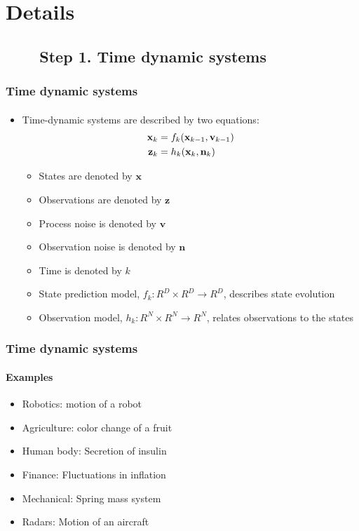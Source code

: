 \section{Details}


\subsection{\ \ \ \ Step 1. Time dynamic systems}
\begin{frame}
\frametitle{Time dynamic systems}
\framesubtitle{}
\mypagenum
\begin{itemize}
\item Time-dynamic systems are described by two equations:
\begin{align*}
\mathbf{x}_k &= f_k(\mathbf{x}_{k-1}, \mathbf{v}_{k-1}) \notag\\
\mathbf{z}_k &= h_k(\mathbf{x}_k, \mathbf{n}_k)
\label{Eq:TDS}
\end{align*}
\begin{itemize}
\item States are denoted by $\mathbf{x}$
\item Observations are denoted by $\mathbf{z}$
\item Process noise is denoted by $\mathbf{v}$
\item Observation noise is denoted by $\mathbf{n}$
\item Time is denoted by $k$
\item State prediction model, ${f_k:R^D \times R^D \rightarrow R^D}$, describes state evolution
\item Observation model, ${h_k:R^N \times R^N \rightarrow R^N}$, relates observations to the states
\end{itemize}
\end{itemize}
\end{frame}



\begin{frame}
\frametitle{Time dynamic systems}
\framesubtitle{Examples}
\mypagenum
\begin{itemize}
\item Robotics: motion of a robot
\item Agriculture: color change of a fruit
\item Human body: Secretion of insulin
\item Finance: Fluctuations in inflation
\item Mechanical: Spring mass system
\item Radars: Motion of an aircraft
\end{itemize}
\end{frame}




